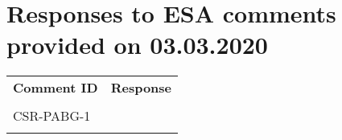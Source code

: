 
\section{Responses to ESA comments provided on 03.03.2020}
\label{sec:ESA:comments:1}


\setlength\LTleft{0pt}
\setlength\LTright{0pt}
\tiny 
\begin{longtable}{|p{1.5cm}|p{12cm}|@{}}
\label{table:comments:responses} 
\textbf{Comment ID}&\textbf{Response}\\
\\
\hline
CSR-PABG-1&
\begin{minipage}{12cm}
\TODO{}
\end{minipage}\\
\\
\hline



\end{longtable}
